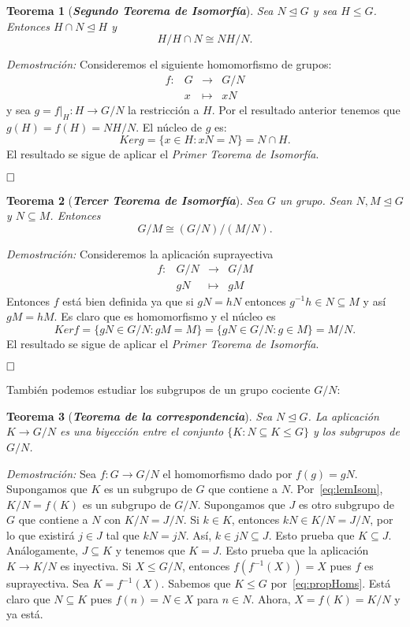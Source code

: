 \documentclass[12pt]{article}
\newtheorem{theorem}{Teorema}[section]
\begin{document}
\begin{theorem}[\textbf{\textit{Segundo Teorema de Isomorfía}}]
Sea $N \unlhd G$ y sea $H \leq G$. Entonces $H \cap N \unlhd H$ y $$H/H\cap N \cong NH/N.$$

\end{theorem}
\emph{Demostración: }Consideremos el siguiente homomorfismo de grupos: $$\begin{array}{rccl}
f\colon &G&\longrightarrow &G/N \\
&x& \longmapsto &xN
\end{array}
$$
y sea $g = \left.f \right|_H \colon H \longrightarrow G/N$ la restricción a $H$. Por el resultado anterior tenemos que $g(H) = f(H) = NH/N$. El núcleo de $g$ es:
$$Ker g = \lbrace x \in H :xN = N \rbrace = N \cap H.$$ El resultado se sigue de aplicar el \textit{Primer Teorema de Isomorfía}.

$\hfill \square$

\begin{theorem}[\textbf{\textit{Tercer Teorema de Isomorfía}}]
Sea $G$ un grupo. Sean $N,M \unlhd G$ y $N \subseteq M$. Entonces $$G/M \cong (G/N)/(M/N).$$
\end{theorem}
\emph{Demostración: }Consideremos la aplicación suprayectiva $$\begin{array}{rccl}
f \colon &G/N&\longrightarrow &G/M\\
&gN& \longmapsto &gM
\end{array}
$$
Entonces $f$ está bien definida ya que si $gN = hN$ entonces $g^{-1}h \in N \subseteq M$ y así $gM =hM$. Es claro que es homomorfismo y el núcleo es $$Ker f = \lbrace gN \in G/N : gM = M \rbrace = \lbrace gN \in G/N : g \in M \rbrace = M/N.$$
El resultado se sigue de aplicar el \textit{Primer Teorema de Isomorfía}.

$\hfill \square$

También podemos estudiar los subgrupos de un grupo cociente $G/N$:

\begin{theorem}[\textbf{\textit{Teorema de la correspondencia}}]
Sea $N \unlhd G$. La aplicación $K \longrightarrow G/N$ es una biyección entre el conjunto $\lbrace K: N \subseteq K \leq G \rbrace$ y los subgrupos de $G/N$.
\end{theorem}
\emph{Demostración: }Sea $f \colon G \longrightarrow G/N$ el homomorfismo dado por $f(g) = gN$. Supongamos que $K$ es un subgrupo de $G$ que contiene a $N$. Por~\ref{eq:lemIsom}, $K/N = f(K)$ es un subgrupo de $G/N$. Supongamos que $J$ es otro subgrupo de $G$ que contiene a $N$ con $K/N = J/N$. Si $k \in K$, entonces $kN \in K/N = J/N$, por lo que existirá $j \in J$ tal que $kN = jN$. Así, $k \in jN \subseteq J$. Esto prueba que $K \subseteq J$. Análogamente, $J \subseteq K$ y tenemos que $K=J$. Esto prueba que la aplicación $K \longrightarrow K/N$ es inyectiva. Si $X \leq G/N$, entonces $f(f^{-1}(X)) = X$ pues $f$ es suprayectiva. Sea $K = f^{-1}(X)$. Sabemos que $K \leq G$ por~\ref{eq:propHoms}. Está claro que $N \subseteq K$ pues $f(n) = N \in X$ para $n \in N$. Ahora, $X=f(K) = K/N$ y ya está.
\end{document}

